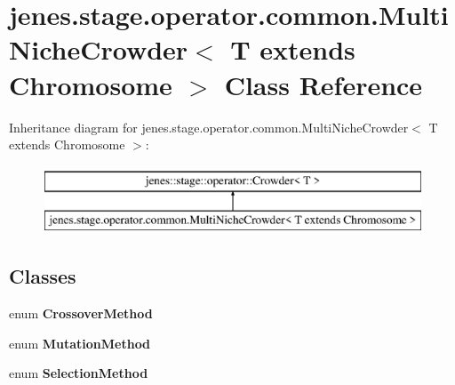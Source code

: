 \hypertarget{classjenes_1_1stage_1_1operator_1_1common_1_1_multi_niche_crowder_3_01_t_01extends_01_chromosome_01_4}{\section{jenes.\-stage.\-operator.\-common.\-Multi\-Niche\-Crowder$<$ T extends Chromosome $>$ Class Reference}
\label{classjenes_1_1stage_1_1operator_1_1common_1_1_multi_niche_crowder_3_01_t_01extends_01_chromosome_01_4}
}
Inheritance diagram for jenes.\-stage.\-operator.\-common.\-Multi\-Niche\-Crowder$<$ T extends Chromosome $>$\-:\begin{figure}[H]
\begin{center}
\leavevmode
\includegraphics[height=2.000000cm]{classjenes_1_1stage_1_1operator_1_1common_1_1_multi_niche_crowder_3_01_t_01extends_01_chromosome_01_4}
\end{center}
\end{figure}
\subsection*{Classes}
\begin{DoxyCompactItemize}
\item 
enum {\bfseries Crossover\-Method}
\item 
enum {\bfseries Mutation\-Method}
\item 
enum {\bfseries Selection\-Method}
\end{DoxyCompactItemize}

